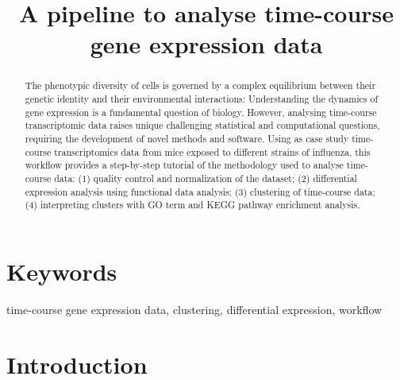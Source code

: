 \documentclass[9pt,a4paper,]{extarticle}
\begin{document}
\pagestyle{front}

\title{A pipeline to analyse time-course gene expression data}


\maketitle
\thispagestyle{front}

\begin{abstract}
The phenotypic diversity of cells is governed by a complex equilibrium between their genetic identity and their environmental interactions: Understanding the dynamics of gene expression is a fundamental question of biology. However, analysing time-course transcriptomic data raises unique challenging statistical and computational questions, requiring the development of novel methods and software. Using as case study time-course transcriptomics data from mice exposed to different strains of influenza, this workflow provides a step-by-step tutorial of the methodology used to analyse time-course data: (1) quality control and normalization of the dataset; (2) differential expression analysis using functional data analysis; (3) clustering of time-course data; (4) interpreting clusters with GO term and KEGG pathway enrichment analysis.
\end{abstract}

\section*{Keywords}
time-course gene expression data, clustering, differential expression, workflow


\clearpage
\pagestyle{main}

\hypertarget{introduction}{%
\section{Introduction}\label{introduction}}
\end{document}

